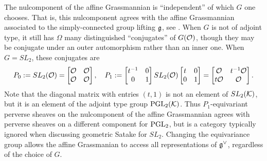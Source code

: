 {\begin{remark} \label{rmk:notadjoint} The nulcomponent of the affine Grassmannian is ``independent'' of which $G$ one chooses. That is, this nulcomponent agrees with the affine Grassmannian associated to the simply-connected group lifting $\mathfrak{g}$, see \cite[Theorem 1.3.11 (3)]{Zhu}. When $G$ is not of adjoint type, it still has $\Omega$ many distinguished ``conjugates'' of $G(\mathcal{O})$, though they may be conjugate under an outer automorphism rather than an inner one. When $G = SL_2$, these conjugates are
\begin{equation} P_0 := SL_2(\mathcal{O}) = \begin{bmatrix} \mathcal{O} & \mathcal{O} \\ \mathcal{O} & \mathcal{O} \end{bmatrix}, \quad P_1 := \begin{bmatrix} t^{-1} & 0 \\ 0 & 1 \end{bmatrix} SL_2(\mathcal{O}) \begin{bmatrix} t & 0 \\ 0 & 1 \end{bmatrix} = \begin{bmatrix} \mathcal{O} & t^{-1}\mathcal{O} \\ t \mathcal{O} & \mathcal{O} \end{bmatrix}. \end{equation}
Note that the diagonal matrix with entries $(t,1)$ is not an element of $SL_2(\mathcal{K})$, but it is an element of the adjoint type group $\operatorname{PGL}_2(\mathcal{K})$. Thus $P_1$-equivariant perverse sheaves on the nulcomponent of the affine Grassmannian agrees with perverse sheaves on a different component for $\operatorname{PGL}_2$, but is a category typically ignored when discussing geometric Satake for $SL_2$. Changing the equivariance group allows the affine Grassmanian to access all representations of $\mathfrak{g}^{\vee}$, regardless of the choice of $G$.
\end{remark}

}
